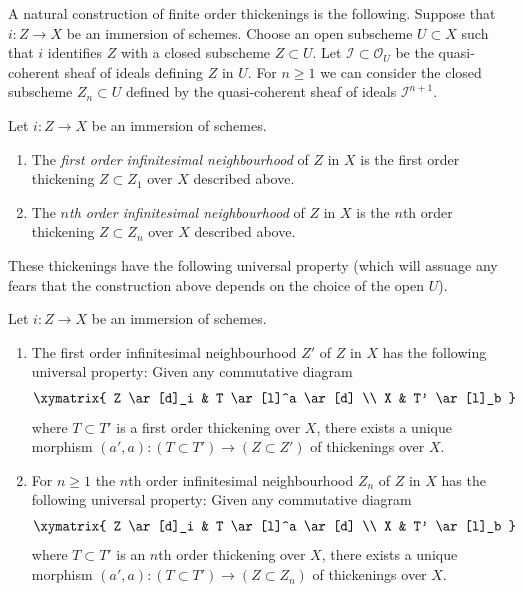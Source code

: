 \noindent
A natural construction of finite order thickenings is the following.
Suppose that $i : Z \to X$ be an immersion of schemes. Choose an
open subscheme $U \subset X$ such that $i$ identifies $Z$ with a closed
subscheme $Z \subset U$. Let $\mathcal{I} \subset \mathcal{O}_U$ be the
quasi-coherent sheaf of ideals defining $Z$ in $U$. For $n \geq 1$
we can consider the closed subscheme $Z_n \subset U$
defined by the quasi-coherent sheaf of ideals $\mathcal{I}^{n + 1}$.

\begin{definition}
\label{definition-first-order-infinitesimal-neighbourhood}
Let $i : Z \to X$ be an immersion of schemes.
\begin{enumerate}
\item The {\it first order infinitesimal neighbourhood} of $Z$ in $X$ is
the first order thickening $Z \subset Z_1$ over $X$ described above.
\item The {\it $n$th order infinitesimal neighbourhood} of $Z$ in $X$ is
the $n$th order thickening $Z \subset Z_n$ over $X$ described above.
\end{enumerate}
\end{definition}

\noindent
These thickenings have the following universal property (which will assuage
any fears that the construction above depends on the choice of the open
$U$).

\begin{lemma}
\label{lemma-first-order-infinitesimal-neighbourhood}
Let $i : Z \to X$ be an immersion of schemes.
\begin{enumerate}
\item The first order infinitesimal neighbourhood $Z'$ of $Z$ in $X$
has the following universal property: Given any commutative diagram
$$
\xymatrix{
Z \ar[d]_i & T \ar[l]^a \ar[d] \\
X & T' \ar[l]_b
}
$$
where $T \subset T'$ is a first order thickening over $X$, there exists
a unique morphism $(a', a) : (T \subset T') \to (Z \subset Z')$ of
thickenings over $X$.
\item For $n \geq 1$ the $n$th order infinitesimal neighbourhood $Z_n$
of $Z$ in $X$ has the following universal property: Given any commutative
diagram
$$
\xymatrix{
Z \ar[d]_i & T \ar[l]^a \ar[d] \\
X & T' \ar[l]_b
}
$$
where $T \subset T'$ is an $n$th order thickening over $X$, there exists
a unique morphism $(a', a) : (T \subset T') \to (Z \subset Z_n)$ of
thickenings over $X$.
\end{enumerate}
\end{lemma}

